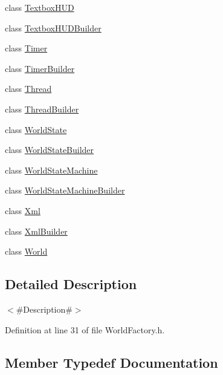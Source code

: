 \begin{DoxyCompactItemize}
\item 
class \mbox{\hyperlink{classnjli_1_1_world_factory_a043f6c225e4e72e1152c60f8c442fdc9}{Textbox\+H\+UD}}
\item 
class \mbox{\hyperlink{classnjli_1_1_world_factory_a750965b3f8531f8610b0ed8fe05c00e8}{Textbox\+H\+U\+D\+Builder}}
\item 
class \mbox{\hyperlink{classnjli_1_1_world_factory_a50de43af5bed41f30c071d8cce0e81bc}{Timer}}
\item 
class \mbox{\hyperlink{classnjli_1_1_world_factory_a4bf1b31126e9d45534b120a6e4af0c08}{Timer\+Builder}}
\item 
class \mbox{\hyperlink{classnjli_1_1_world_factory_adbc148eaddd341d7ae4d07c9e9e33bfd}{Thread}}
\item 
class \mbox{\hyperlink{classnjli_1_1_world_factory_a96c37036c1767736e6aa216fd68b62a8}{Thread\+Builder}}
\item 
class \mbox{\hyperlink{classnjli_1_1_world_factory_a59cdb6fe5b378389e35b8b2a2f4e990e}{World\+State}}
\item 
class \mbox{\hyperlink{classnjli_1_1_world_factory_a3d8dab2e937d753e7ddb14442e9acdea}{World\+State\+Builder}}
\item 
class \mbox{\hyperlink{classnjli_1_1_world_factory_a737b3b9af90a96d9da0b4f27196f97d1}{World\+State\+Machine}}
\item 
class \mbox{\hyperlink{classnjli_1_1_world_factory_abe950a299dceab3248d0732737858b94}{World\+State\+Machine\+Builder}}
\item 
class \mbox{\hyperlink{classnjli_1_1_world_factory_a6da91779d499b1ad3035fe196aecd99a}{Xml}}
\item 
class \mbox{\hyperlink{classnjli_1_1_world_factory_ab51c8e735775c191a627d07f8ca5890d}{Xml\+Builder}}
\item 
class \mbox{\hyperlink{classnjli_1_1_world_factory_a7b4bcdf992c21ae83363f25df05b1d25}{World}}
\end{DoxyCompactItemize}


\subsection{Detailed Description}
$<$\#\+Description\#$>$ 

Definition at line 31 of file World\+Factory.\+h.



\subsection{Member Typedef Documentation}
\mbox{\label{classnjli_1_1_world_factory_a0b1357052d11887d1561fbd882acd177}} 
